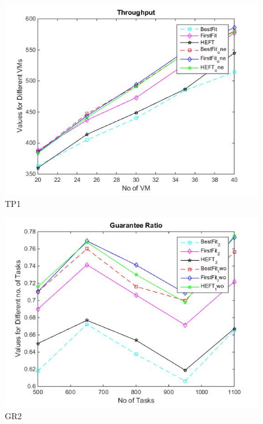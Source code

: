 \documentclass[conference]{IEEEtran}
\begin{document}

\begin{figure}[htbp]
\includegraphics[scale=0.45]{tp_1_p.jpg}
\caption{TP1}
\label{fig}
\end{figure}


\begin{figure}[htbp]
\includegraphics[scale=0.45]{gr_2_p.jpg}
\caption{GR2}
\label{fig}
\end{figure}
\end{document}

